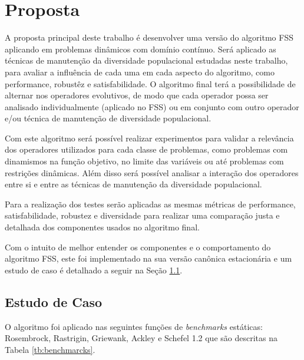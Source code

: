 \chapter{Proposta}
\label{ch:proposta}

A proposta principal deste trabalho é desenvolver uma versão do algoritmo FSS aplicando em problemas dinâmicos com domínio contínuo. Será aplicado as técnicas de manutenção da diversidade populacional estudadas neste trabalho, para avaliar a influência de cada uma em cada aspecto do algoritmo, como performance, robustêz e satisfabilidade. O algoritmo final terá a possibilidade de alternar nos operadores evolutivos, de modo que cada operador possa ser analisado individualmente (aplicado no FSS) ou em conjunto com outro operador e/ou técnica de manutenção de diversidade populacional.

Com este algoritmo será possível realizar experimentos para validar a relevância dos operadores utilizados para cada classe de problemas, como problemas com dinamismos na função objetivo, no limite das variáveis ou até problemas com restrições dinâmicas. Além disso será possível analisar a interação dos operadores entre si e entre as técnicas de manutenção da diversidade populacional.

Para a realização dos testes serão aplicadas as mesmas métricas de performance, satisfabilidade, robustez e diversidade para realizar uma comparação justa e detalhada dos componentes usados no algoritmo final. 

Com o intuito de melhor entender os componentes e o comportamento do algoritmo FSS, este foi implementado na sua versão canônica estacionária e um estudo de caso é detalhado a seguir na Seção \ref{sec:test_case}.

\section{Estudo de Caso}
\label{sec:test_case}

O algoritmo foi aplicado nas seguintes funções de \textit{benchmarks} estáticas: Rosembrock, Rastrigin, Griewank, Ackley e Schefel 1.2 que são descritas na Tabela \ref{tb:benchmarcks}.

